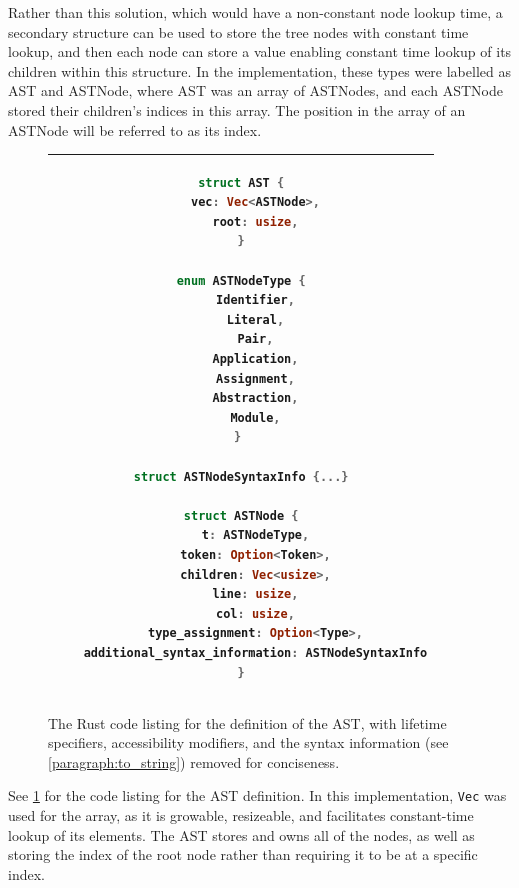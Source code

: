 Rather than this solution, which would have a non-constant node lookup time, a secondary structure can be used to store the tree nodes with constant time lookup, and then each node can store a value enabling constant time lookup of its children within this structure. In the implementation, these types were labelled as AST and ASTNode, where AST was an array of ASTNodes, and each ASTNode stored their children's indices in this array. The position in the array of an ASTNode will be referred to as its index.

\begin{figure}[t]
    \centering
    \begin{tabular}{|c|}
    \hline
    \begin{lstlisting}[language=Rust]
struct AST {
    vec: Vec<ASTNode>,
    root: usize,
}

enum ASTNodeType {
    Identifier,
    Literal,
    Pair,
    Application,
    Assignment,
    Abstraction,
    Module,
} 

struct ASTNodeSyntaxInfo {...}

struct ASTNode {
    t: ASTNodeType,
    token: Option<Token>,
    children: Vec<usize>,
    line: usize,
    col: usize,
    type_assignment: Option<Type>,
    additional_syntax_information: ASTNodeSyntaxInfo
}
    \end{lstlisting}
    \\\hline
    \end{tabular}
    \caption{The Rust code listing for the definition of the AST, with lifetime specifiers, accessibility modifiers, and the syntax information (see \ref{paragraph:to_string}) removed for conciseness.}
    \label{fig:ast_lst}
\end{figure}

See \ref{fig:ast_lst} for the code listing for the AST definition. In this implementation, \verb|Vec| was used for the array, as it is growable, resizeable, and facilitates constant-time lookup of its elements. The AST stores and owns all of the nodes, as well as storing the index of the root node rather than requiring it to be at a specific index. 

